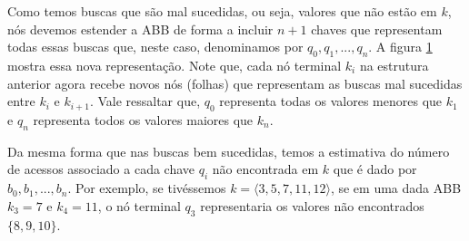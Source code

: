 Como temos buscas que são mal sucedidas, ou seja, valores que não estão em $k$, nós devemos estender a ABB de forma a incluir $n+1$ chaves que representam todas essas buscas que, neste caso, denominamos por $q_0, q_1, ..., q_n$. A figura \ref{fig:6.8-2} mostra essa nova representação. Note que, cada nó terminal $k_i$ na estrutura anterior agora recebe novos nós (folhas) que representam as buscas mal sucedidas entre $k_i$ e $k_{i+1}$. Vale ressaltar que, $q_0$ representa todas os valores menores que $k_1$ e $q_n$ representa todos os valores maiores que $k_n$.

Da mesma forma que nas buscas bem sucedidas, temos a estimativa do número de acessos associado a cada chave $q_i$ não encontrada em $k$ que é dado por $b_0, b_1, ..., b_n$.  Por exemplo, se tivéssemos $k = \langle 3, 5, 7, 11, 12\rangle$, se em uma dada ABB $k_3 = 7$ e $k_4 = 11$, o nó terminal $q_3$ representaria os valores não encontrados $\{8, 9, 10\}$.

\begin{figure}[!h]
\centering
{}
\label{fig:6.8-2}
\end{figure}

